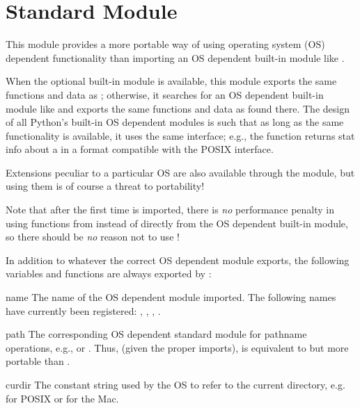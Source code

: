 \section{Standard Module }
\label{module-os}

This module provides a more portable way of using operating system
(OS) dependent functionality than importing an OS dependent built-in
module like .

When the optional built-in module  is available, this
module exports the same functions and data as ; otherwise,
it searches for an OS dependent built-in module like  and
exports the same functions and data as found there.  The design of all
Python's built-in OS dependent modules is such that as long as the same
functionality is available, it uses the same interface; e.g., the
function  returns stat info about a  in a
format compatible with the POSIX interface.

Extensions peculiar to a particular OS are also available through the
 module, but using them is of course a threat to portability!

Note that after the first time  is imported, there is \emph{no}
performance penalty in using functions from  instead of
directly from the OS dependent built-in module, so there should be
\emph{no} reason not to use !

In addition to whatever the correct OS dependent module exports, the
following variables and functions are always exported by :

\renewcommand{\indexsubitem}{(in module os)}

\begin{datadesc}{name}
The name of the OS dependent module imported.  The following names
have currently been registered: , ,
, .
\end{datadesc}

\begin{datadesc}{path}
The corresponding OS dependent standard module for pathname
operations, e.g.,  or .  Thus, (given
the proper imports),  is equivalent to but
more portable than .
\end{datadesc}

\begin{datadesc}{curdir}
The constant string used by the OS to refer to the current directory,
e.g.  for POSIX or  for the Mac.
\end{datadesc}

